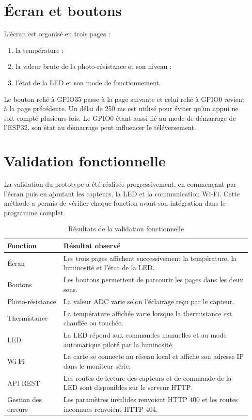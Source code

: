 \documentclass[12pt,a4paper]{report}
\begin{document}
\section{Écran et boutons}

L'écran est organisé en trois pages :

\begin{enumerate}
  \item la température ;
  \item la valeur brute de la photo-résistance et son niveau ;
  \item l'état de la LED et son mode de fonctionnement.
\end{enumerate}

Le bouton relié à GPIO35 passe à la page suivante et celui relié à GPIO0
revient à la page précédente. Un délai de 250 ms est utilisé pour éviter
qu'un appui ne soit compté plusieurs fois. Le GPIO0 étant aussi lié au mode de
démarrage de l'ESP32, son état au démarrage peut influencer le téléversement.

\section{Validation fonctionnelle}

La validation du prototype a été réalisée progressivement, en commençant par
l'écran puis en ajoutant les capteurs, la LED et la communication Wi-Fi. Cette
méthode a permis de vérifier chaque fonction avant son intégration dans le
programme complet.

\begin{table}[H]
  \centering
  \caption{Résultats de la validation fonctionnelle}
  \label{tab:validation}
  \begin{tabular}{>{\raggedright\arraybackslash}p{4cm}>{\raggedright\arraybackslash}p{10cm}}
    \toprule
    Fonction & Résultat observé \\
    \midrule
    Écran & Les trois pages affichent successivement la température, la luminosité et l'état de la LED. \\
    Boutons & Les boutons permettent de parcourir les pages dans les deux sens. \\
    Photo-résistance & La valeur ADC varie selon l'éclairage reçu par le capteur. \\
    Thermistance & La température affichée varie lorsque la thermistance est chauffée ou touchée. \\
    LED & La LED répond aux commandes manuelles et au mode automatique piloté par la luminosité. \\
    Wi-Fi & La carte se connecte au réseau local et affiche son adresse IP dans le moniteur série. \\
    API REST & Les routes de lecture des capteurs et de commande de la LED sont disponibles sur le serveur HTTP. \\
    Gestion des erreurs & Les paramètres invalides renvoient HTTP 400 et les routes inconnues renvoient HTTP 404. \\
    \bottomrule
  \end{tabular}
\end{table}
\end{document}
